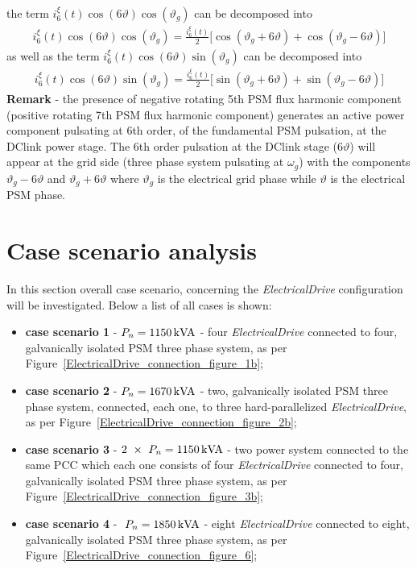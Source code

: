 \documentclass[12pt,a4paper]{scrartcl}
\begin{document}
\begin{onehalfspace}
the term $i_6^\xi(t)\cos(6\vartheta)\cos(\vartheta_g)$ can be decomposed into 
\begin{equation}
	\begin{aligned}
		i_6^\xi(t)\cos(6\vartheta)\cos(\vartheta_g) = \frac{i_6^\xi(t)}{2}\Big[\cos(\vartheta_g+6\vartheta)+\cos(\vartheta_g-6\vartheta)\Big]
	\end{aligned}
\end{equation}
as well as the term $i_6^\xi(t)\cos(6\vartheta)\sin(\vartheta_g)$ can be decomposed into 
\begin{equation}
	\begin{aligned}
		i_6^\xi(t)\cos(6\vartheta)\sin(\vartheta_g) = \frac{i_6^\xi(t)}{2}\Big[\sin(\vartheta_g+6\vartheta)+\sin(\vartheta_g-6\vartheta)\Big]
	\end{aligned}
\end{equation}
\noindent\textbf{Remark} - the presence of negative rotating 5th PSM flux harmonic component (positive rotating 7th PSM flux harmonic component) generates an active power component pulsating at 6th order, of the fundamental PSM pulsation, at the DClink power stage. The 6th order pulsation at the DClink stage ($6\vartheta$) will appear at the grid side (three phase system pulsating at $\omega_g$) with the components $\vartheta_g - 6\vartheta$ and $\vartheta_g + 6\vartheta$ where $\vartheta_g$ is the electrical grid phase while $\vartheta$ is the electrical PSM phase.

\section{Case scenario analysis}	
In this section overall case scenario, concerning the \textit{ElectricalDrive} configuration will be investigated. Below a list of all cases is shown:
\begin{itemize}
	\item[--] \textbf{case scenario 1} - $P_n = \SI{1150}{\kilo{\volt\ampere}}$  - four \textit{ElectricalDrive} connected to four, galvanically isolated PSM three phase system, as per Figure~\ref{ElectricalDrive_connection_figure_1b};
	\item[--] \textbf{case scenario 2} - $P_n = \SI{1670}{\kilo{\volt\ampere}}$  - two, galvanically isolated PSM three phase system, connected, each one, to three hard-parallelized \textit{ElectricalDrive}, as per Figure~\ref{ElectricalDrive_connection_figure_2b};
	\item[--] \textbf{case scenario 3} - $2\ \times \ P_n = \SI{1150}{\kilo{\volt\ampere}}$  - two power system connected to the same PCC which each one consists of four \textit{ElectricalDrive} connected to four, galvanically isolated PSM three phase system, as per Figure~\ref{ElectricalDrive_connection_figure_3b};
	\item[--] \textbf{case scenario 4} - $\ P_n = \SI{1850}{\kilo{\volt\ampere}}$  - eight \textit{ElectricalDrive} connected to eight, galvanically isolated PSM three phase system, as per Figure~\ref{ElectricalDrive_connection_figure_6};
\end{itemize}


\end{onehalfspace}
\end{document}
